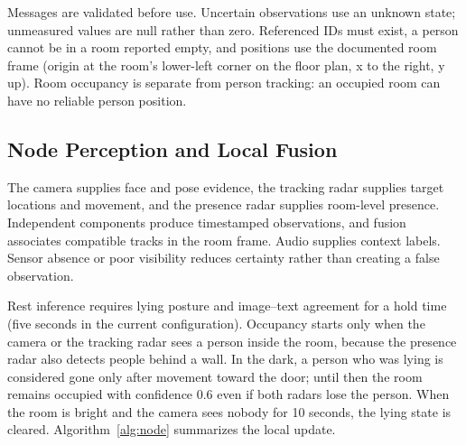 \documentclass[conference]{IEEEtran}
\begin{document}
Messages are validated before use. Uncertain observations use an
unknown state; unmeasured values are null rather than zero.
Referenced IDs must exist, a person cannot be in a room reported
empty, and positions use the documented room frame (origin at the
room's lower-left corner on the floor plan, x to the right, y up).
Room occupancy is separate from person tracking: an occupied room
can have no reliable person position.

\subsection{Node Perception and Local Fusion}
\label{sec:node}

The camera supplies face and pose evidence, the tracking radar
supplies target locations and movement, and the presence radar
supplies room-level presence. Independent components produce
timestamped observations, and fusion associates compatible tracks
in the room frame. Audio supplies context labels. Sensor absence or
poor visibility reduces certainty rather than creating a false
observation.

Rest inference requires lying posture and image--text agreement
for a hold time (five seconds in the current configuration).
Occupancy starts only when the camera or the tracking radar sees a
person inside the room, because the presence radar also detects
people behind a wall. In the dark, a person who was lying is
considered gone only after movement toward the door; until then the
room remains occupied with confidence 0.6 even if both radars lose
the person. When the room is bright and the camera sees nobody for
10 seconds, the lying state is cleared. Algorithm~\ref{alg:node} summarizes the local update.
\end{document}
